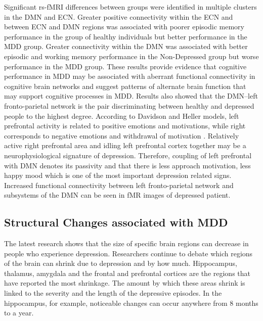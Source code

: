 ﻿\documentclass[12pt]{article}
\begin{document}
Significant rs-fMRI differences between groups were identified in
multiple clusters in the DMN and ECN. Greater positive connectivity
within the ECN and between ECN and DMN regions was associated with
poorer episodic memory performance in the group of healthy individuals
but better performance in the MDD group. Greater connectivity within
the DMN was associated with better episodic and working memory
performance in the Non-Depressed group but worse performance in the
MDD group. These results provide evidence that cognitive performance
in MDD may be associated with aberrant functional connectivity in
cognitive brain networks and suggest patterns of alternate brain
function that may support cognitive processes in MDD. Results also
showed that the DMN–left fronto-parietal network is the pair
discriminating between healthy and depressed people to the highest
degree. According to Davidson and Heller models, left prefrontal
activity is related to positive emotions and motivations, while right
corresponds to negative emotions and withdrawal of motivation
\cite{model}. Relatively active right prefrontal area and idling left
prefrontal cortex together may be a neurophysiological signature of
depression. Therefore, coupling of left prefrontal with DMN denotes
its passivity and that there is less approach motivation, less happy
mood which is one of the most important depression related
signs. Increased functional connectivity between left fronto-parietal
network and subsystems of the DMN can be seen in fMR images of
depressed patient.

\subsection{Structural Changes associated with MDD}

The latest research \cite{brainvolume} shows that the size of specific
brain regions can decrease in people who experience
depression. Researchers continue to debate which regions of the brain
can shrink due to depression and by how much. Hippocampus, thalamus,
amygdala and the frontal and prefrontal cortices are the regions that
have reported the most shrinkage. The amount by which these areas
shrink is linked to the severity and the length of the depressive
episodes. In the hippocampus, for example, noticeable changes can
occur anywhere from 8 months to a year. \cite{effectMDD}
\end{document}
